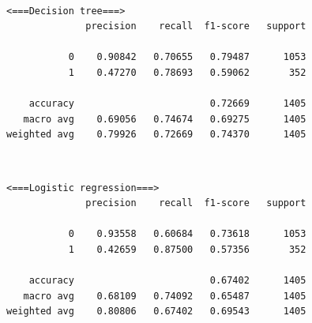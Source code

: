 \documentclass[11pt]{article}
\begin{document}
    \begin{center}
    \end{center}
    { \hspace*{\fill} \\}
    
    \begin{Verbatim}[commandchars=\\\{\}]
 <===Decision tree===>
              precision    recall  f1-score   support

           0    0.90842   0.70655   0.79487      1053
           1    0.47270   0.78693   0.59062       352

    accuracy                        0.72669      1405
   macro avg    0.69056   0.74674   0.69275      1405
weighted avg    0.79926   0.72669   0.74370      1405

    \end{Verbatim}

    \begin{center}
    \end{center}
    { \hspace*{\fill} \\}
    
    \begin{Verbatim}[commandchars=\\\{\}]
 <===Logistic regression===>
              precision    recall  f1-score   support

           0    0.93558   0.60684   0.73618      1053
           1    0.42659   0.87500   0.57356       352

    accuracy                        0.67402      1405
   macro avg    0.68109   0.74092   0.65487      1405
weighted avg    0.80806   0.67402   0.69543      1405

    \end{Verbatim}

    \begin{center}
    \end{center}
    { \hspace*{\fill} \\}
    

    
    
    
\end{document}
